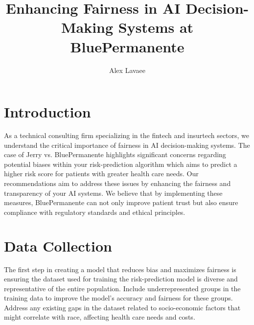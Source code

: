 \documentclass[11pt]{article}
\title{Enhancing Fairness in AI Decision-Making Systems at BluePermanente}
\author[1]{Alex Lavaee}
\affil[1]{EquiTech Corp.}
\date{}
\begin{document}
\maketitle

\section{Introduction}





As a technical consulting firm specializing in the fintech and insurtech sectors, we understand the critical importance of fairness in AI decision-making systems. The case of Jerry vs. BluePermanente highlights significant concerns regarding potential biases within your risk-prediction algorithm which aims to predict a higher risk score for patients with greater health care needs. Our recommendations aim to address these issues by enhancing the fairness and transparency of your AI systems. We believe that by implementing these measures, BluePermanente can not only improve patient trust but also ensure compliance with regulatory standards and ethical principles.

\section{Data Collection}

The first step in creating a model that reduces bias and maximizes fairness is ensuring the dataset used for training the risk-prediction model is diverse and representative of the entire population. Include underrepresented groups in the training data to improve the model's accuracy and fairness for these groups. Address any existing gaps in the dataset related to socio-economic factors that might correlate with race, affecting health care needs and costs.\\
\end{document}
